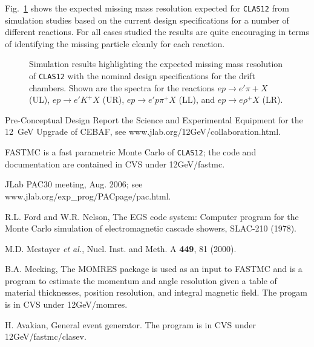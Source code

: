 Fig.~\ref{massplot} shows the expected missing mass resolution 
expected for {\tt CLAS12} from simulation studies based on the current
design specifications for a number of different reactions.  For all
cases studied the results are quite encouraging in terms of identifying
the missing particle cleanly for each reaction.

\begin{figure}[htbp]
\vspace{14.0cm}
\caption{\small{Simulation results highlighting the expected missing
mass resolution of {\tt CLAS12} with the nominal design specifications for
the drift chambers.  Shown are the spectra for the reactions
$ep \to e'\pi+X$ (UL), $ep \to e'K^+X$ (UR), $ep \to e'p\pi^+X$ (LL),
and $ep \to e\rho^+X$ (LR).}}
\label{massplot}
\end{figure}

\vfil
\eject

\begin{thebibliography}{99}

Pre-Conceptual Design Report the Science and Experimental Equipment
for the 12~GeV Upgrade of CEBAF, see www.jlab.org/12GeV/collaboration.html.

FASTMC is a fast parametric Monte Carlo of {\tt CLAS12}; the code and 
documentation are contained in CVS under 12GeV/fastmc.

JLab PAC30 meeting, Aug. 2006; see www.jlab.org/exp\_prog/PACpage/pac.html.

R.L. Ford and W.R. Nelson, The EGS code system: Computer program for the 
Monte Carlo simulation of electromagnetic cascade showers, SLAC-210 (1978).
 
M.D. Mestayer {\it et al.}, Nucl. Inst. and Meth. A {\bf 449}, 81 (2000).

B.A. Mecking, The MOMRES package is used as an input to FASTMC and is
a program to estimate the momentum and angle resolution given a table of 
material thicknesses, position resolution, and integral magnetic field.
The progam is in CVS under 12GeV/momres.

H. Avakian, General event generator.  The program is in CVS under
12GeV/fastmc/clasev.

\end{thebibliography}




